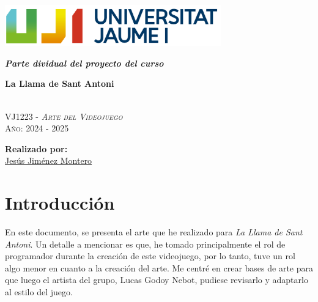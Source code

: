 \documentclass[12pt]{article}
\begin{document}
\pagecolor{pageColor}
\color{textColor}
\begin{titlepage}
    \vspace*{\fill}

    \centering
    \parbox{0.8\textwidth}{    %
        \includegraphics[width=0.7\textwidth]{imgs/marca-uji-color-fons-transparent.png}\par\vspace{1cm}

        {\Huge \bfseries \textit{Parte dividual del proyecto del curso} \par}
        {\Large \bfseries La Llama de Sant Antoni \par}

        \textsc{\large }
        \vspace{0.5cm} \\
        \textsc{\Large VJ1223 - \textit{Arte del Videojuego}}
        \vspace{0.5cm} \\
        \textsc{\large Año: 2024 - 2025}
        \vfill

        \textbf{Realizado por:}         \\
        \href{https://www.richardotomislav.com/}{Jesús Jiménez Montero}      \\
    }
    \vspace*{\fill}
\end{titlepage}

\hypertarget{toc}{}
\tableofcontents
\newpage

\listoffigures
\newpage


\section{Introducción}
    En este documento, se presenta el arte que he realizado para \textit{La Llama de Sant Antoni}. Un detalle a mencionar es que, he tomado principalmente el rol de programador durante la creación de este videojuego, por lo tanto, tuve un rol algo menor en cuanto a la creación del arte. Me centré en crear bases de arte para que luego el artista del grupo, Lucas Godoy Nebot, pudiese revisarlo y adaptarlo al estilo del juego.
\end{document}
